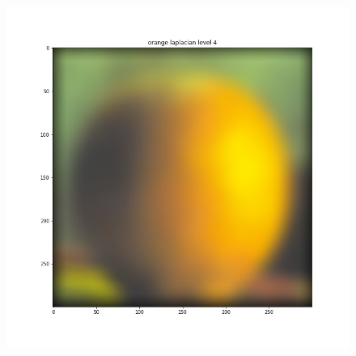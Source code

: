 \documentclass{article}
\begin{document}
\begin{figure}[!htb]
\endminipage
{}
    \includegraphics[width=\linewidth]{orange laplacian level 4.png}
\endminipage
\end{figure}
\FloatBarrier
\end{document}
